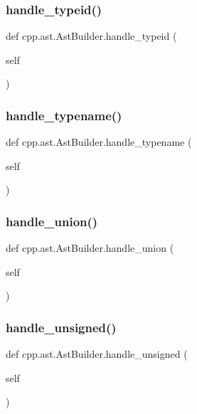 \subsubsection{\texorpdfstring{handle\_typeid()}{handle\_typeid()}}
{\footnotesize\ttfamily def cpp.\+ast.\+Ast\+Builder.\+handle\+\_\+typeid (\begin{DoxyParamCaption}\item[{}]{self }\end{DoxyParamCaption})}

\mbox{\label{classcpp_1_1ast_1_1AstBuilder_a4b7b3bb4f47f67052b04e5da173d1c6b}} 
\subsubsection{\texorpdfstring{handle\_typename()}{handle\_typename()}}
{\footnotesize\ttfamily def cpp.\+ast.\+Ast\+Builder.\+handle\+\_\+typename (\begin{DoxyParamCaption}\item[{}]{self }\end{DoxyParamCaption})}

\mbox{\label{classcpp_1_1ast_1_1AstBuilder_a9b3fbfb21c6e23f04fd596d590f93eee}} 
\subsubsection{\texorpdfstring{handle\_union()}{handle\_union()}}
{\footnotesize\ttfamily def cpp.\+ast.\+Ast\+Builder.\+handle\+\_\+union (\begin{DoxyParamCaption}\item[{}]{self }\end{DoxyParamCaption})}

\mbox{\label{classcpp_1_1ast_1_1AstBuilder_a793123ea878db159de1662c10bdae897}} 
\subsubsection{\texorpdfstring{handle\_unsigned()}{handle\_unsigned()}}
{\footnotesize\ttfamily def cpp.\+ast.\+Ast\+Builder.\+handle\+\_\+unsigned (\begin{DoxyParamCaption}\item[{}]{self }\end{DoxyParamCaption})}

